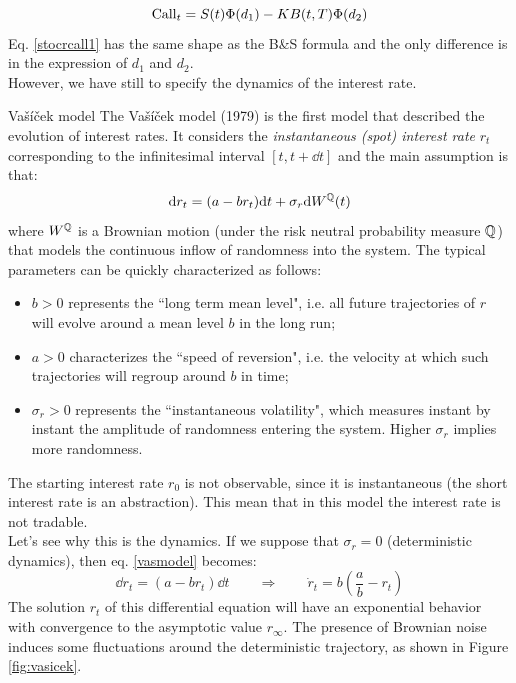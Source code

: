 \begin{equation}\label{stocrcall1}
    \operatorname{Call}_t = S(t)\Phi(d_1) - KB(t,T)\Phi(d_2)
\end{equation}
Eq. \eqref{stocrcall1} has the same shape as the B\&S formula and the only difference is in the expression of $d_1$ and $d_2$.\\ However, we have still to specify the dynamics of the interest rate. %
\begin{example}{Vašíček model}{}{}
    The Vašíček model (1979) is the first model that described the evolution of interest rates. It considers the \emph{instantaneous (spot) interest rate} $r_t$ corresponding to the infinitesimal interval $[t,t+\dd t]$ and the main assumption is that:
    \begin{equation}\label{vasmodel}
        \dd r_t = (a-br_t)\dd t + \sigma_r\dd W^{\mathbb{Q}}(t)
    \end{equation}
    where $W^{\mathbb{Q}}$ is a Brownian motion (under the risk neutral probability measure $\mathbb{Q}$) that models the continuous inflow of randomness into the system. The typical parameters can be quickly characterized as follows:
    \begin{itemize}
        \item $b>0$ represents the ``long term mean level", i.e. all future trajectories of $r$ will evolve around a mean level $b$ in the long run;
        \item $a>0$ characterizes the ``speed of reversion", i.e.  the velocity at which such trajectories will regroup around $b$ in time;
        \item $\sigma_r>0$ represents the ``instantaneous volatility", which measures instant by instant the amplitude of randomness entering the system. Higher $\sigma_r$ implies more randomness.
    \end{itemize}
    The starting interest rate $r_0$ is not observable, since it is instantaneous (the short interest rate is an abstraction). This mean that in this model the interest rate is not tradable.\\
    Let's see why this is the dynamics. If we suppose that $\sigma_r=0$ (deterministic dynamics), then eq. \eqref{vasmodel} becomes:
    \begin{equation}\label{rdyn}
        \dd r_t = (a-br_t)\dd t \qquad\Rightarrow\qquad \Dot{r}_t = b\left(\frac{a}{b}-r_t\right)
    \end{equation}
    The solution $r_t$ of this differential equation will have an exponential behavior with convergence to the asymptotic value $r_{\infty}$. The presence of Brownian noise induces some fluctuations around the deterministic trajectory, as shown in Figure \ref{fig:vasicek}.

\end{example}
